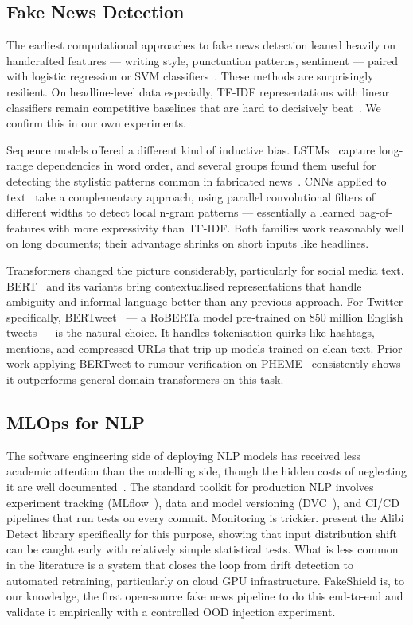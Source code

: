 \documentclass[sigconf]{acmart}
\begin{document}
\subsection{Fake News Detection}

The earliest computational approaches to fake news detection leaned heavily on handcrafted
features — writing style, punctuation patterns, sentiment — paired with logistic regression
or SVM classifiers~\cite{perez2017automatic}. These methods are surprisingly resilient.
On headline-level data especially, TF-IDF representations with linear classifiers remain
competitive baselines that are hard to decisively beat~\cite{ahmed2018detecting}. We confirm
this in our own experiments.

Sequence models offered a different kind of inductive bias. LSTMs~\cite{hochreiter1997long}
capture long-range dependencies in word order, and several groups found them useful for
detecting the stylistic patterns common in fabricated news~\cite{wang2017liar}. CNNs applied
to text~\cite{kim2014convolutional} take a complementary approach, using parallel convolutional
filters of different widths to detect local n-gram patterns — essentially a learned bag-of-features
with more expressivity than TF-IDF. Both families work reasonably well on long documents;
their advantage shrinks on short inputs like headlines.

Transformers changed the picture considerably, particularly for social media text.
BERT~\cite{devlin2019bert} and its variants bring contextualised representations that handle
ambiguity and informal language better than any previous approach. For Twitter specifically,
BERTweet~\cite{nguyen2020bertweet} — a RoBERTa model pre-trained on 850 million English tweets
— is the natural choice. It handles tokenisation quirks like hashtags, mentions, and compressed
URLs that trip up models trained on clean text. Prior work applying BERTweet to rumour
verification on PHEME~\cite{zubiaga2016analysing} consistently shows it outperforms general-domain
transformers on this task.

\subsection{MLOps for NLP}

The software engineering side of deploying NLP models has received less academic attention than
the modelling side, though the hidden costs of neglecting it are well documented~\cite{sculley2015hidden}.
The standard toolkit for production NLP involves experiment tracking (MLflow~\cite{zaharia2018accelerating}),
data and model versioning (DVC~\cite{kupriianova2021dvc}), and CI/CD pipelines that run tests
on every commit. Monitoring is trickier. \citet{klaise2021alibi} present the Alibi Detect library
specifically for this purpose, showing that input distribution shift can be caught early with
relatively simple statistical tests. What is less common in the literature is a system that
closes the loop from drift detection to automated retraining, particularly on cloud GPU
infrastructure. FakeShield is, to our knowledge, the first open-source fake news pipeline
to do this end-to-end and validate it empirically with a controlled OOD injection experiment.
\end{document}
